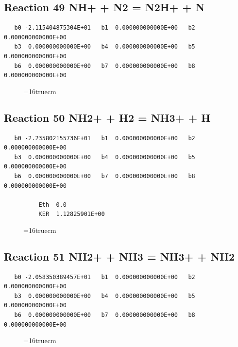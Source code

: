 \documentclass[12pt,dvipdfm]{article}
\begin{document}
\subsection{
Reaction 49 NH+ + N2 = N2H+ + N }
\begin{small}\begin{verbatim}
   b0 -2.115404875304E+01   b1  0.000000000000E+00   b2  0.000000000000E+00
   b3  0.000000000000E+00   b4  0.000000000000E+00   b5  0.000000000000E+00
   b6  0.000000000000E+00   b7  0.000000000000E+00   b8  0.000000000000E+00
\end{verbatim}\end{small}
\begin{figure}[h!] \label{n2rates}
\epsfxsize=16truecm
\end{figure}
\newpage

\subsection{
Reaction 50 NH2+ + H2 = NH3+ + H }
\begin{small}\begin{verbatim}
   b0 -2.235802155736E+01   b1  0.000000000000E+00   b2  0.000000000000E+00
   b3  0.000000000000E+00   b4  0.000000000000E+00   b5  0.000000000000E+00
   b6  0.000000000000E+00   b7  0.000000000000E+00   b8  0.000000000000E+00

          Eth  0.0
          KER  1.12825901E+00
\end{verbatim}\end{small}
\begin{figure}[h!] \label{n2rates}
\epsfxsize=16truecm
\end{figure}
\newpage

\subsection{
Reaction 51 NH2+ + NH3 = NH3+ + NH2 }
\begin{small}\begin{verbatim}
   b0 -2.058350389457E+01   b1  0.000000000000E+00   b2  0.000000000000E+00
   b3  0.000000000000E+00   b4  0.000000000000E+00   b5  0.000000000000E+00
   b6  0.000000000000E+00   b7  0.000000000000E+00   b8  0.000000000000E+00
\end{verbatim}\end{small}
\begin{figure}[h!] \label{n2rates}
\epsfxsize=16truecm
\end{figure}
\newpage
\end{document}
